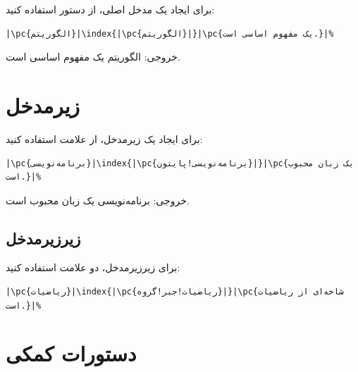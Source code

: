 برای ایجاد یک مدخل اصلی، از دستور 
استفاده کنید:

\begin{latin}
\begin{verbatim}
|\pc{الگوریتم}|\index{|\pc{الگوریتم}|}|\pc{یک مفهوم اساسی است.}|%
\end{verbatim}
\end{latin}

خروجی: الگوریتم یک مفهوم اساسی است.


\section{زیرمدخل}
\label{sec:index-sub}

برای ایجاد یک زیرمدخل، از علامت \lr{!} استفاده
کنید:

\begin{latin}
\begin{verbatim}
|\pc{برنامه‌نویسی}|\index{|\pc{برنامه‌نویسی!پایتون}|}|\pc{یک زبان محبوب است.}|%
\end{verbatim}
\end{latin}

خروجی: برنامه‌نویسی یک
زبان محبوب است.


\subsection{زیرزیرمدخل}
\label{sec:index-subsub}

برای زیرزیرمدخل، دو علامت \lr{!} استفاده
کنید:

\begin{latin}
\begin{verbatim}
|\pc{ریاضیات}|\index{|\pc{ریاضیات!جبر!گروه}|}|\pc{شاخه‌ای از ریاضیات است.}|%
\end{verbatim}
\end{latin}


\section{دستورات کمکی}
\label{sec:index-helpers}

